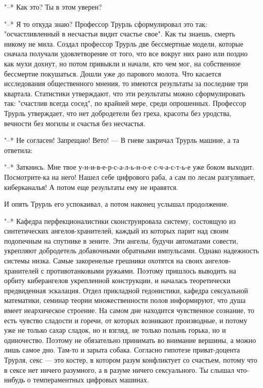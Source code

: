 "--* Как это? Ты в этом уверен?

"--* Я то откуда знаю? Профессор Трурль сформулировал это
так: "осчастливленный в несчастьи видит счастье свое". Как
ты знаешь, смерть никому не мила. Создал профессор Трурль
две бессмертные модели, которые сначала получали
удовлетворение от того, что все вокруг них рано или поздно
как мухи дохнут, но потом привыкли и начали, кто чем мог, на
собственное бессмертие покушаться. Дошли уже до парового
молота. Что касается исследования общественного мнения, то
имеются результаты за последние три квартала. Статистики
утверждают, что эти результаты можно сформулировать так:
"счастлив всегда сосед", по крайней мере, среди опрошенных.
Профессор Трурль утверждает, что нет добродетели без греха,
красоты без уродства, вечности без могилы и счастья без
несчастья.

"--* Не согласен! Запрещаю! Вето! --- В гневе закричал
Трурль машине, а та ответила:

"--* Заткнись. Мне твое у-н-и-в-е-р-с-а-л-ь-н-о-е
с-ч-а-с-т-ь-е уже боком выходит. Посмотрите-ка на него! Нашел
себе цифрового раба, а сам по лесам разгуливает,
киберканалья! А потом еще результаты ему не нравятся.

И опять Трурль его успокаивал, а потом наконец услышал
продолжение.

"--* Кафедра перфекционалистики сконструировала систему,
состоящую из синтетических ангелов-хранителей, каждый из
которых парит над своим подопечным на спутнике в зените. Эти
ангелы, будучи автоматами совести, укрепляют добродетель
добавочными обратными импульсами. Однако надежность системы
низка. Самые закоренелые грешники охотятся на своих
ангелов-хранителей с противотанковыми ружьями. Поэтому
пришлось выводить на орбиту киберангелов укрепленной
конструкции, и началась теоретически предвиденная эскалация.
Отдел прикладной гедонистики, кафедра сексуальной
математики, семинар теории множественности полов
информируют, что душа имеет иеархическое строение. На самом
дне находится чувственное сознание, то есть чувство сладости
и горечи, от которых возникают производные, и потому уже не
только сахар сладок, но и взгляд, не только полынь горька,
но и одиночество. Поэтому не обязательно принимать во
внимание вершины, а можно лишь самое дно. Там-то и зарыта
собака. Согласно гипотезе приват-доцента Трурля, секс --- это
костер, в котором разум конфликтует со счастьем, потому
что в сексе нет ничего разумного, а в разуме ничего
сексуального. Ты слышал что-нибудь о темпераментных цифровых
машинах.

